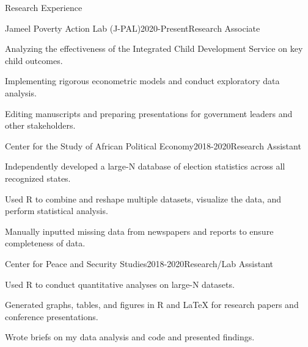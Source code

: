 \documentclass[10pt]{resume} %
\begin{document}
	\begin{rSection}{Research Experience}
		
		\begin{rSubsection}{Jameel Poverty Action Lab (J-PAL)}{2020-Present}{Research Associate}{}
		\item Analyzing the effectiveness of the Integrated Child Development Service on key child outcomes.  
		\item Implementing rigorous econometric models and conduct exploratory data analysis.
		\item Editing manuscripts and preparing presentations for government leaders and other stakeholders.
		\end{rSubsection}
		
		\begin{rSubsection}{Center for the Study of African Political Economy}{2018-2020}{Research Assistant}{}
			\item Independently developed a large-N database of election statistics across all recognized states.
			\item Used R to combine and reshape multiple datasets, visualize the data, and perform statistical analysis.
			\item Manually inputted missing data from newspapers and reports to ensure completeness of data. 
		\end{rSubsection}
		
		\begin{rSubsection}{Center for Peace and Security Studies}{2018-2020}{Research/Lab Assistant}{}
			\item Used R to conduct quantitative analyses on large-N datasets.
			\item Generated graphs, tables, and figures in R and LaTeX for research papers and conference presentations.
			\item Wrote briefs on my data analysis and code and presented findings. 
			
		\end{rSubsection}
		
		

\end{rSection}
\end{document}
